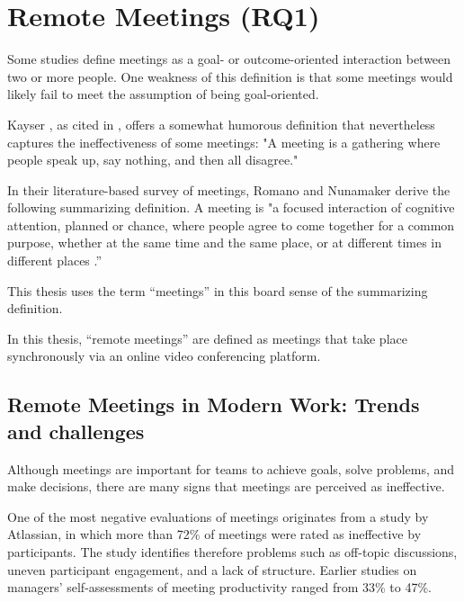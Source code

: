 \section{Remote Meetings (RQ1)}

Some studies define meetings as a goal- or outcome-oriented interaction between two or more
people. \cite[p. 148]{beranekFacilitationGroupSupport1993}
One weakness of this definition is that some meetings would likely fail to meet the
assumption of being goal-oriented.

Kayser \cite{kayserMiningGroupGold1990}, as cited
in \cite[p.1]{romanoMeetingAnalysisFindings2001}, offers a somewhat humorous definition that nevertheless captures the
ineffectiveness of some meetings: "A meeting is a gathering where people speak up, say nothing, and
then all disagree."

In their literature-based survey of meetings, Romano and Nunamaker derive the following
summarizing definition. A meeting is "a focused interaction of cognitive attention, planned or chance,
where people agree to come together for a common purpose, whether at the same time and the same place, or at
different times in different places \cite[p.1]{romanoMeetingAnalysisFindings2001}.”

This thesis uses the term “meetings” in this board sense of the summarizing definition.

In this thesis, “remote meetings” are defined as meetings that take place synchronously via an online
video conferencing platform.

\subsection{Remote Meetings in Modern Work: Trends and challenges}
\label{sec:meetings-in-modern-work}

Although meetings are important for teams to achieve goals, solve problems, and make
decisions, there are many signs that meetings are perceived as ineffective.

One of the most negative evaluations of meetings originates from a study by Atlassian, in which
more than 72\% of meetings were rated as ineffective by participants.
The study identifies therefore problems such as off-topic discussions,
uneven participant engagement, and a lack of structure.
\cite{atlassianWorkplaceWoesMeetings} Earlier studies on managers' self-assessments of meeting productivity
ranged from 33\% to 47\%\cite[p. 1]{romanoMeetingAnalysisFindings2001}.


